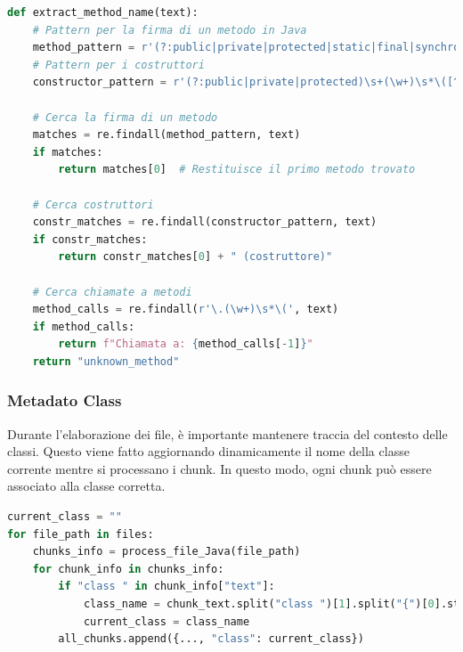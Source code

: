 \documentclass[12pt,a4paper,openright,twoside]{book}
\begin{document}
\begin{lstlisting}[language=Python, caption={Estrazione contesto dai chunk}]
    def extract_method_name(text):
    # Pattern per la firma di un metodo in Java
    method_pattern = r'(?:public|private|protected|static|final|synchronized|abstract|native)\s+[\w<>\[\]]+\s+(\w+)\s*\([^)]*\)'
    # Pattern per i costruttori
    constructor_pattern = r'(?:public|private|protected)\s+(\w+)\s*\([^)]*\)'
    
    # Cerca la firma di un metodo
    matches = re.findall(method_pattern, text)
    if matches:
        return matches[0]  # Restituisce il primo metodo trovato
    
    # Cerca costruttori
    constr_matches = re.findall(constructor_pattern, text)
    if constr_matches:
        return constr_matches[0] + " (costruttore)"
    
    # Cerca chiamate a metodi
    method_calls = re.findall(r'\.(\w+)\s*\(', text)
    if method_calls:
        return f"Chiamata a: {method_calls[-1]}"
    return "unknown_method"
\end{lstlisting}

\subsubsection{Metadato Class}
Durante l'elaborazione dei file, è importante mantenere traccia del contesto delle classi.
Questo viene fatto aggiornando dinamicamente il nome della classe corrente mentre si processano i chunk.
In questo modo, ogni chunk può essere associato alla classe corretta.

\begin{lstlisting}[language=Python, caption={Aggiornamento contesto classe}]
current_class = ""
for file_path in files:
    chunks_info = process_file_Java(file_path)
    for chunk_info in chunks_info:
        if "class " in chunk_info["text"]:
            class_name = chunk_text.split("class ")[1].split("{")[0].strip()
            current_class = class_name
        all_chunks.append({..., "class": current_class})
\end{lstlisting}
\end{document}
